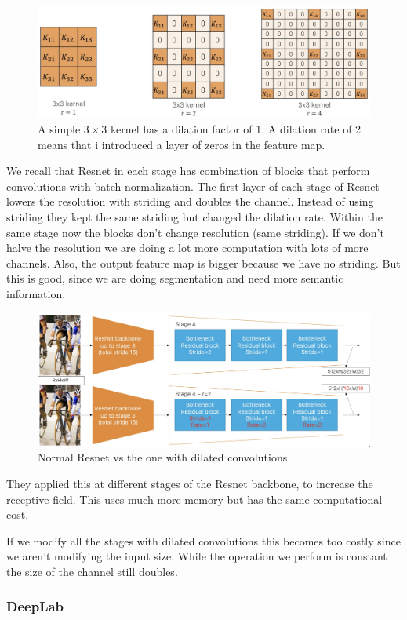\begin{figure}[htbp]
  \centering
  \includegraphics[width=0.7\linewidth]{./img/dilated_convolutions.jpg}
  \caption{A simple $3 \times 3$ kernel has a dilation factor of 1. A dilation rate of 2 means that i introduced a layer of zeros in the feature map.}
\end{figure}

We recall that Resnet in each stage has combination of blocks that perform convolutions with batch normalization.
The first layer of each stage of Resnet lowers the resolution with striding and doubles the channel.
Instead of using striding they kept the same striding but changed the dilation rate.
Within the same stage now the blocks don't change resolution (same striding).
If we don't halve the resolution we are doing a lot more computation with lots of more channels.
Also, the output feature map is bigger because we have no striding.
But this is good, since we are doing segmentation and need more semantic information.

\begin{figure}[htbp]
  \centering
  \includegraphics[width=0.7\linewidth]{./img/dilated_resnet.jpg}
  \caption{Normal Resnet vs the one with dilated convolutions}
\end{figure}

They applied this at different stages of the Resnet backbone, to increase the receptive field.
This uses much more memory but has the same computational cost.

If we modify all the stages with dilated convolutions this becomes too costly since we aren't modifying the input size.
While the operation we perform is constant the size of the channel still doubles.

\subsubsection{DeepLab}


